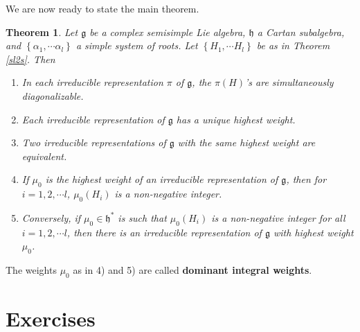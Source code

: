 \documentclass{amsbook}
\let \frak = \mathfrak
\theoremstyle{plain}
\newtheorem{theorem}{Theorem}
\numberwithin{equation}{chapter}
\numberwithin{theorem}{chapter}
\begin{document}
We are now ready to state the main theorem.

\begin{theorem}
\label{classify.ss.reps}Let $\frak{g}$ be a complex semisimple Lie algebra,
$\frak{h}$ a Cartan subalgebra, and $\left\{  \alpha_{1},\cdots\alpha
_{l}\right\}  $ a simple system of roots. Let $\left\{  H_{1},\cdots
H_{l}\right\}  $ be as in Theorem \ref{sl2s}. Then

\begin{enumerate}
\item  In each irreducible representation $\pi$ of $\frak{g}$, the $\pi(H)$'s
are simultaneously diagonalizable.

\item  Each irreducible representation of $\frak{g}$ has a unique highest weight.

\item  Two irreducible representations of $\frak{g}$ with the same highest
weight are equivalent.

\item  If $\mu_{0}$ is the highest weight of an irreducible representation of
$\frak{g}$, then for $i=1,2,\cdots l$, $\mu_{0}(H_{i})$ is a non-negative integer.

\item  Conversely, if $\mu_{0}\in\frak{h}^{\ast}$ is such that $\mu_{0}%
(H_{i})$ is a non-negative integer for all $i=1,2,\cdots l$, then there is an
irreducible representation of $\frak{g}$ with highest weight $\mu_{0}$.
\end{enumerate}
\end{theorem}

The weights $\mu_{0}$ as in 4) and 5) are called \textbf{dominant integral
weights}.

\section{Exercises}
\end{document}
